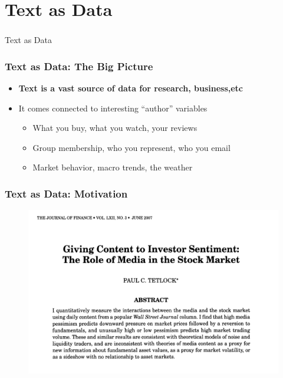 \documentclass[
  shownotes,
  xcolor={svgnames},
  hyperref={colorlinks,citecolor=DarkBlue,linkcolor=DarkRed,urlcolor=DarkBlue}
  , aspectratio=169]{beamer}
\newcommand{\theme}{\color{andesred}}
\begin{document}
\section{Text as Data}
\begin{frame}[fragile]
\frametitle{}


\centering
{\huge \textcolor{andesred}{Text as Data}}


\end{frame}
\begin{frame}[fragile]
\frametitle{Text as Data: The Big Picture}

\begin{itemize}


\item {\bf \theme Text is a vast source of data for research, business,etc }
\medskip
\item It comes connected to interesting ``author'' variables 
\medskip
  \begin{itemize}
  \item What you buy, what you watch, your reviews
  \medskip
  \item Group membership, who you represent, who you email
  \medskip
  \item Market behavior, macro trends, the weather
  \end{itemize}

 

\end{itemize}

\end{frame}
\begin{frame}[fragile]
\frametitle{Text as Data: Motivation}


  \begin{figure}[H] \centering
            \captionsetup{justification=centering}
              \includegraphics[scale=0.5]{figures/Tetlock.png}
              
 \end{figure}

\end{frame}
\end{document}
